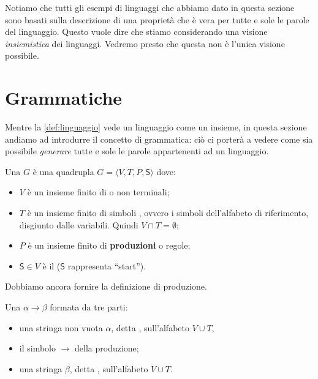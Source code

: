 Notiamo che tutti gli esempi di linguaggi che abbiamo dato in questa sezione sono basati sulla descrizione di una
proprietà che è vera per tutte e sole le parole del linguaggio.
Questo vuole dire che stiamo considerando una visione \emph{insiemistica} dei linguaggi.
Vedremo presto che questa non è l'unica visione possibile.


\section{Grammatiche}\label{sec:grammatiche}

Mentre la \ref{def:linguaggio} vede un linguaggio come un insieme, in questa sezione andiamo ad introdurre il concetto
di grammatica: ciò ci porterà a vedere come sia possibile \emph{generare} tutte e sole le parole appartenenti ad un linguaggio.


\begin{definition}[Grammatica]\label{def:grammatica}
Una  $G$ è una quadrupla $G=\langle V, T, P, \mathsf{S} \rangle$ dove:
\begin{itemize}
	\item $V$ è un insieme finito di  o non terminali;
	\item $T$ è un insieme finito di simboli , ovvero i simboli dell'alfabeto di riferimento,
	  disgiunto dalle variabili.
Quindi $V \cap T=\emptyset$;
	\item $P$ è un insieme finito di \textbf{produzioni} o regole;
	\item $\mathsf{S}\in V$ è il  ($\mathsf{S}$ rappresenta ``start'').
\end{itemize}
\end{definition}


Dobbiamo ancora fornire la definizione di produzione.

\begin{definition}\label{def:produzione}
Una  $\alpha \to \beta$ formata da tre parti:
\begin{itemize}
\item una stringa non vuota $\alpha$, detta ,  sull'alfabeto $V \cup T$,
	  \item il simbolo $\to$ della produzione;
\item una stringa $\beta$, detta ,  sull'alfabeto $V \cup T$.
\end{itemize}
\end{definition}

